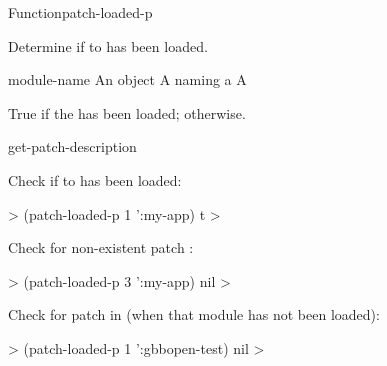\documentclass[10pt,twoside,english,pdftex]{article}
\begin{document}

\begin{functiondoc}{Function}{patch-loaded-p}%
  {
    }
%
%

\fnsyntax 

\fnpurpose Determine if   to  has
been loaded.

\fnpackage {}

\fnmodule {}

\fnargs
\begin{args}{module-name}
\arg[id] An object
 A  naming a 
\arg[boolean] A 
\end{args}

\fnreturns True if the  has been loaded; \nil{} otherwise.

\fnerrors
\modulenotdefined

\begin{alsos}{get-patch-description}
\also[patch]
\end{alsos}

\fnexamples
%
Check if   to   has
been loaded:
%
\W\supp
\begin{example}
  > (patch-loaded-p 1 ':my-app)
  t
  >
\end{example}

Check for non-existent patch :
%
\W\supp
\begin{example}
  > (patch-loaded-p 3 ':my-app)
  nil
  >
\end{example}

Check for patch  in   (when
that module has not been loaded):
%
\W\supp
\begin{example}
  > (patch-loaded-p 1 ':gbbopen-test)
  nil
  >
\end{example}

\end{functiondoc}

\end{document}
